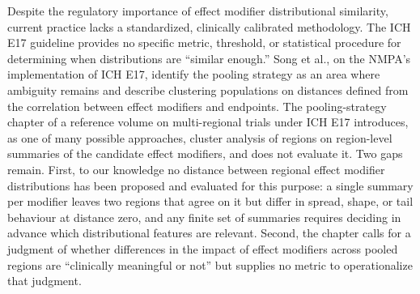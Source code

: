 \documentclass[AMA,Times1COL]{WileyNJDv5}
\begin{document}
Despite the regulatory importance of effect modifier distributional similarity, current practice lacks a standardized, clinically calibrated methodology. The ICH E17 guideline provides no specific metric, threshold, or statistical procedure for determining when distributions are ``similar enough.'' Song et al., on the NMPA's implementation of ICH E17, identify the pooling strategy as an area where ambiguity remains and describe clustering populations on distances defined from the correlation between effect modifiers and endpoints.\cite{song2025} The pooling-strategy chapter of a reference volume on multi-regional trials under ICH E17 introduces, as one of many possible approaches, cluster analysis of regions on region-level summaries of the candidate effect modifiers, and does not evaluate it.\cite{komiyama2024} Two gaps remain. First, to our knowledge no distance between regional effect modifier distributions has been proposed and evaluated for this purpose: a single summary per modifier leaves two regions that agree on it but differ in spread, shape, or tail behaviour at distance zero, and any finite set of summaries requires deciding in advance which distributional features are relevant. Second, the chapter calls for a judgment of whether differences in the impact of effect modifiers across pooled regions are ``clinically meaningful or not'' but supplies no metric to operationalize that judgment.
\end{document}

